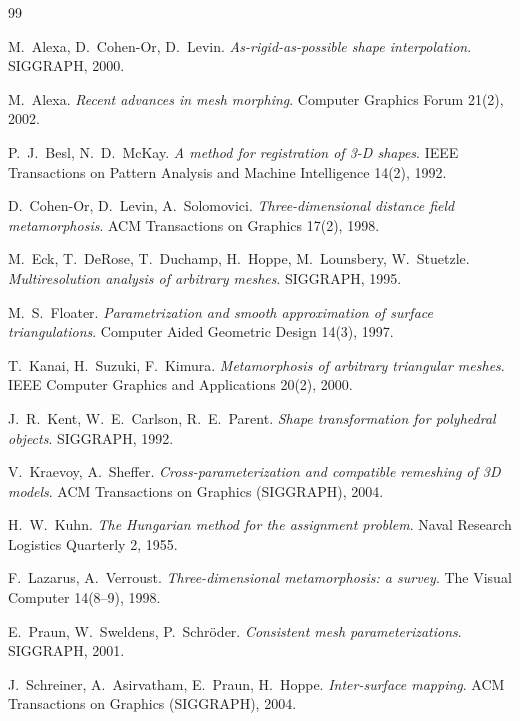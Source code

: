 \documentclass[11pt,a4paper]{article}
\begin{document}
\begin{thebibliography}{99}
\small

 M.~Alexa, D.~Cohen-Or, D.~Levin.
  \emph{As-rigid-as-possible shape interpolation}. SIGGRAPH, 2000.

 M.~Alexa.
  \emph{Recent advances in mesh morphing}. Computer Graphics Forum 21(2), 2002.

 P.~J.~Besl, N.~D.~McKay.
  \emph{A method for registration of 3-D shapes}. IEEE Transactions on
  Pattern Analysis and Machine Intelligence 14(2), 1992.

 D.~Cohen-Or, D.~Levin, A.~Solomovici.
  \emph{Three-dimensional distance field metamorphosis}. ACM Transactions on
  Graphics 17(2), 1998.

 M.~Eck, T.~DeRose, T.~Duchamp, H.~Hoppe, M.~Lounsbery,
  W.~Stuetzle. \emph{Multiresolution analysis of arbitrary meshes}.
  SIGGRAPH, 1995.

 M.~S.~Floater.
  \emph{Parametrization and smooth approximation of surface triangulations}.
  Computer Aided Geometric Design 14(3), 1997.

 T.~Kanai, H.~Suzuki, F.~Kimura.
  \emph{Metamorphosis of arbitrary triangular meshes}. IEEE Computer
  Graphics and Applications 20(2), 2000.

 J.~R.~Kent, W.~E.~Carlson, R.~E.~Parent.
  \emph{Shape transformation for polyhedral objects}. SIGGRAPH, 1992.

 V.~Kraevoy, A.~Sheffer.
  \emph{Cross-parameterization and compatible remeshing of 3D models}.
  ACM Transactions on Graphics (SIGGRAPH), 2004.

 H.~W.~Kuhn.
  \emph{The Hungarian method for the assignment problem}. Naval Research
  Logistics Quarterly 2, 1955.

 F.~Lazarus, A.~Verroust.
  \emph{Three-dimensional metamorphosis: a survey}. The Visual Computer
  14(8--9), 1998.

 E.~Praun, W.~Sweldens, P.~Schr\"oder.
  \emph{Consistent mesh parameterizations}. SIGGRAPH, 2001.

 J.~Schreiner, A.~Asirvatham, E.~Praun, H.~Hoppe.
  \emph{Inter-surface mapping}. ACM Transactions on Graphics (SIGGRAPH), 2004.


\end{thebibliography}
\end{document}
